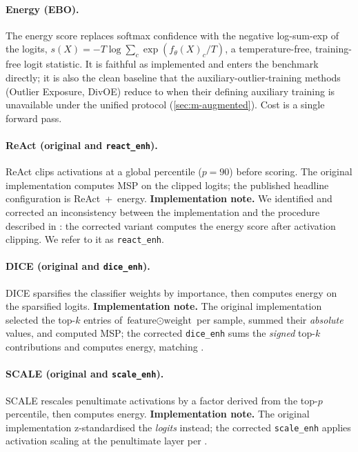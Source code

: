 \documentclass[11pt]{article}
\begin{document}
\paragraph{Energy (EBO).}
The energy score \citep{Liu2020} replaces softmax confidence with the negative
log-sum-exp of the logits, $s(X) = -T\log\sum_c \exp(f_\theta(X)_c / T)$, a
temperature-free, training-free logit statistic. It is faithful as implemented and
enters the benchmark directly; it is also the clean baseline that the
auxiliary-outlier-training methods (Outlier Exposure, DivOE) reduce to when their
defining auxiliary training is unavailable under the unified protocol
(\cref{sec:m-augmented}). Cost is a single forward pass.

\paragraph{ReAct (original and \texttt{react\_enh}).}
ReAct \citep{Sun2021} clips activations at a global percentile ($p=90$) before
scoring. The original implementation computes MSP on the clipped logits; the
published headline configuration is ReAct~+~energy. \textbf{Implementation note.} We
identified and corrected an inconsistency between the implementation and the
procedure described in \citet{Sun2021}: the corrected variant computes the energy
score after activation clipping. We refer to it as \texttt{react\_enh}.

\paragraph{DICE (original and \texttt{dice\_enh}).}
DICE \citep{Sun2022} sparsifies the classifier weights by importance, then computes
energy on the sparsified logits. \textbf{Implementation note.} The original
implementation selected the top-$k$ entries of $\text{feature}\odot\text{weight}$
per sample, summed their \emph{absolute} values, and computed MSP; the corrected
\texttt{dice\_enh} sums the \emph{signed} top-$k$ contributions and computes energy,
matching \citet{Sun2022}.

\paragraph{SCALE (original and \texttt{scale\_enh}).}
SCALE \citep{Xu2024} rescales penultimate activations by a factor derived from the
top-$p$ percentile, then computes energy. \textbf{Implementation note.} The original
implementation z-standardised the \emph{logits} instead; the corrected
\texttt{scale\_enh} applies activation scaling at the penultimate layer per
\citet{Xu2024}.
\end{document}
